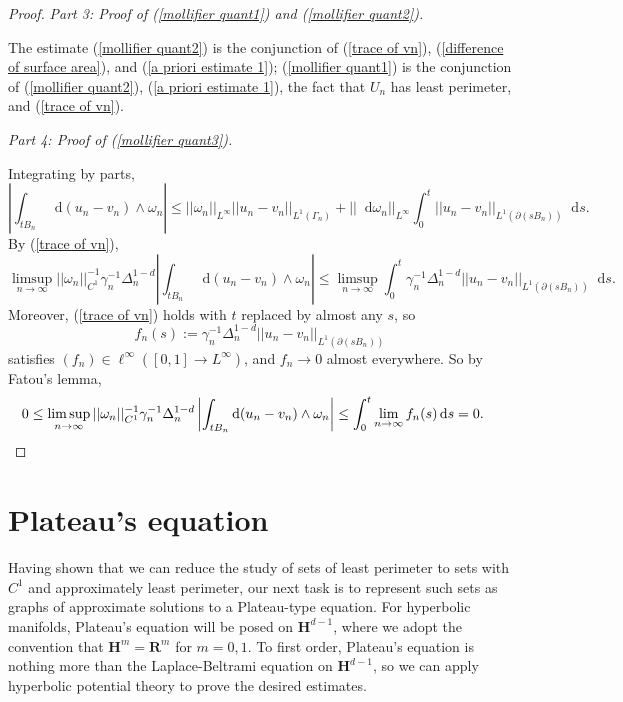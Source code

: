 \documentclass[reqno,12pt,letterpaper]{amsart}
\newcommand{\RR}{\mathbf{R}}
\newcommand{\Hyp}{\mathbf H}
\newcommand*\dif{\mathop{}\!\mathrm{d}}
\theoremstyle{definition}
\newcommand{\proofpart}[2]{%
  \par
  \addvspace{\medskipamount}%
  \noindent\emph{Part #1: #2.}
}
\numberwithin{equation}{section}
\begin{document}
\begin{proof}
\proofpart{3}{Proof of (\ref{mollifier quant1}) and (\ref{mollifier quant2})}
The estimate (\ref{mollifier quant2}) is the conjunction of (\ref{trace of vn}), (\ref{difference of surface area}), and (\ref{a priori estimate 1});
(\ref{mollifier quant1}) is the conjunction of (\ref{mollifier quant2}), (\ref{a priori estimate 1}), the fact that $U_n$ has least perimeter, and (\ref{trace of vn}).

\proofpart{4}{Proof of (\ref{mollifier quant3})}
Integrating by parts,
$$\left|\int_{tB_n} \dif (u_n - v_n) \wedge \omega_n\right| \leq ||\omega_n||_{L^\infty} ||u_n - v_n||_{L^1(\Gamma_n)} + ||\dif \omega_n||_{L^\infty} \int_0^t ||u_n - v_n||_{L^1(\partial(sB_n))} \dif s.$$
By (\ref{trace of vn}),
$$\limsup_{n \to \infty} ||\omega_n||_{C^1}^{-1} \gamma_n^{-1} \Delta_n^{1 - d} \left|\int_{tB_n} \dif(u_n - v_n) \wedge \omega_n\right| \leq \limsup_{n \to \infty} \int_0^t \gamma_n^{-1} \Delta_n^{1 - d} ||u_n - v_n||_{L^1(\partial(sB_n))} \dif s.$$
Moreover, (\ref{trace of vn}) holds with $t$ replaced by almost any $s$, so
$$f_n(s) := \gamma_n^{-1} \Delta_n^{1 - d} ||u_n - v_n||_{L^1(\partial(sB_n))}$$
satisfies $(f_n) \in \ell^\infty([0, 1] \to L^\infty)$, and $f_n \to 0$ almost everywhere.
So by Fatou's lemma,
\begin{align*}
0 \leq \limsup_{n \to \infty} ||\omega_n||_{C^1}^{-1} \gamma_n^{-1} \Delta_n^{1 - d} \left|\int_{tB_n} \dif(u_n - v_n) \wedge \omega_n\right| &\leq \int_0^t \lim_{n \to \infty} f_n(s) \dif s = 0. \qedhere
\end{align*}
\end{proof}



\section{Plateau's equation}\label{Plateau section}
Having shown that we can reduce the study of sets of least perimeter to sets with $C^1$ and approximately least perimeter, our next task is to represent such sets as graphs of approximate solutions to a Plateau-type equation.
For hyperbolic manifolds, Plateau's equation will be posed on $\Hyp^{d - 1}$, where we adopt the convention that $\Hyp^m = \RR^m$ for $m = 0, 1$.
To first order, Plateau's equation is nothing more than the Laplace-Beltrami equation on $\Hyp^{d - 1}$, so we can apply hyperbolic potential theory to prove the desired estimates.
\end{document}
